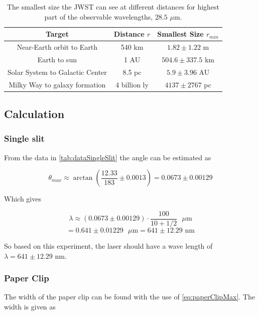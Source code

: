 \documentclass{emulateapj}
\begin{document}
\begin{table}[H]
\centering
\begin{tabular}{ c c c }
Target & Distance $r$ & Smallest Size $r_{min}$ \\
\hline
Near-Earth orbit to Earth & 540 km &$1.82 \pm 1.22$ m \\
Earth to sun & 1 AU & $504.6 \pm 337.5$ km \\
Solar System to Galactic Center & 8.5 pc & $5.9 \pm 3.96$ AU \\
Milky Way to galaxy formation &  4 billion ly & $4137 \pm 2767$ pc 
\end{tabular}
\caption{The smallest size the JWST can see at different distances for highest part of the observable wavelengths, $28.5$ $\mu$m. }
\end{table}\label{tab:visionJWSTHeigh}


\subsection{Calculation}
\subsubsection{Single slit}


From the data in \ref{tab:dataSingleSlit} the angle can be estimated as

\begin{equation}
\theta_{max} \approx \arctan\left( \frac{12.33}{183} \pm 0.0013 \right) = 0.0673 \pm 0.00129
\end{equation}

Which gives 

\begin{equation}
\lambda \approx (0.0673 \pm 0.00129) \cdot \frac{100}{10 +1/2}\text{ }\mu \text{m} 
\end{equation}
\begin{equation}
= 0.641\pm 0.01229\text{ }\mu \text{m} = 641 \pm 12.29 \text{ nm}
\end{equation}\label{eq:waveLenghtLaser}

So based on this experiment, the laser should have a wave length of $\lambda = 641 \pm 12.29 \text{ nm} $.

\subsubsection{Paper Clip}

The width of the paper clip can be found with the use of \eqref{eq:paperClipMax}. The width is given as
\end{document}
